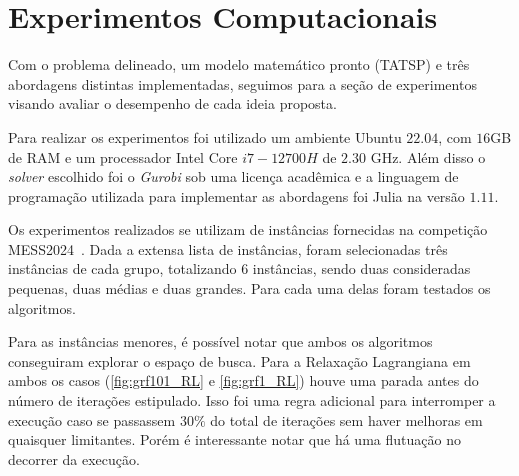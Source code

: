 \chapter{Experimentos Computacionais}
\label{chap:experiments}

\noindent Com o problema delineado, um modelo matemático pronto (TATSP) e três abordagens distintas implementadas, seguimos para a seção de experimentos visando avaliar o desempenho de cada ideia proposta.

Para realizar os experimentos foi utilizado um ambiente Ubuntu $22.04$, com $16$GB de RAM e um processador Intel Core $i7-12700H$ de $2.30$ GHz. Além disso o \emph{solver} escolhido foi o \emph{Gurobi} sob uma licença acadêmica e a linguagem de programação utilizada para implementar as abordagens foi Julia na versão $1.11$.

Os experimentos realizados se utilizam de instâncias fornecidas na competição MESS2024~\cite{MESS2024}. Dada a extensa lista de instâncias, foram selecionadas três instâncias de cada grupo, totalizando 6 instâncias, sendo duas consideradas pequenas, duas médias e duas grandes. Para cada uma delas foram testados os algoritmos.

Para as instâncias menores, é possível notar que ambos os algoritmos conseguiram explorar o espaço de busca. Para a Relaxação Lagrangiana em ambos os casos (\autoref{fig:grf101_RL} e \autoref{fig:grf1_RL}) houve uma parada antes do número de iterações estipulado. Isso foi uma regra adicional para interromper a execução caso se passassem $30\%$ do total de iterações sem haver melhoras em quaisquer limitantes. Porém é interessante notar que há uma flutuação no decorrer da execução.

